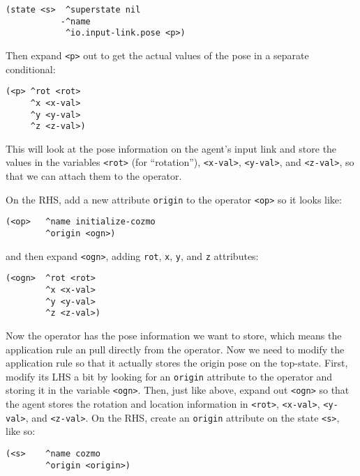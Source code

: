 \begin{verbatim}
(state <s>  ^superstate nil
           -^name
            ^io.input-link.pose <p>)
\end{verbatim}

Then expand \texttt{\textless{}p\textgreater{}} out to get the actual
values of the pose in a separate conditional:

\begin{verbatim}
(<p> ^rot <rot>
     ^x <x-val>
     ^y <y-val>
     ^z <z-val>)
\end{verbatim}

This will look at the pose information on the agent's input link and
store the values in the variables \texttt{\textless{}rot\textgreater{}}
(for ``rotation''), \texttt{\textless{}x-val\textgreater{}},
\texttt{\textless{}y-val\textgreater{}}, and
\texttt{\textless{}z-val\textgreater{}}, so that we can attach them to
the operator.

On the RHS, add a new attribute \texttt{origin} to the operator
\texttt{\textless{}op\textgreater{}} so it looks like:

\begin{verbatim}
(<op>   ^name initialize-cozmo
        ^origin <ogn>)
\end{verbatim}

and then expand \texttt{\textless{}ogn\textgreater{}}, adding
\texttt{rot}, \texttt{x}, \texttt{y}, and \texttt{z} attributes:

\begin{verbatim}
(<ogn>  ^rot <rot>
        ^x <x-val>
        ^y <y-val>
        ^z <z-val>)
\end{verbatim}

Now the operator has the pose information we want to store, which means
the application rule an pull directly from the operator. Now we need to
modify the application rule so that it actually stores the origin pose
on the top-state. First, modify its LHS a bit by looking for an
\texttt{origin} attribute to the operator and storing it in the variable
\texttt{\textless{}ogn\textgreater{}}. Then, just like above, expand out
\texttt{\textless{}ogn\textgreater{}} so that the agent stores the
rotation and location information in
\texttt{\textless{}rot\textgreater{}},
\texttt{\textless{}x-val\textgreater{}},
\texttt{\textless{}y-val\textgreater{}}, and
\texttt{\textless{}z-val\textgreater{}}. On the RHS, create an
\texttt{origin} attribute on the state
\texttt{\textless{}s\textgreater{}}, like so:

\begin{verbatim}
(<s>    ^name cozmo
        ^origin <origin>)
\end{verbatim}

